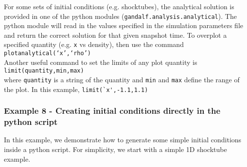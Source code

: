 \documentclass[a4paper]{article}
\newcommand{\var}[1]{\texttt{#1}}
\newcommand{\singlecommand}[1]{\\ \newline \indent \var{#1} \\ \newline \noindent}
\begin{document}




\noindent For some sets of initial conditions (e.g. shocktubes), the analytical solution is provided in one of the python modules (\var{gandalf.analysis.analytical}).  The python module will read in the values specified in the simulation parameters file and return the correct solution for that given snapshot time.  To overplot a specified quantity (e.g. \var{x} vs density), then use the command \singlecommand{plotanalytical(`x',`rho')}  Another useful command to set the limits of any plot quantity is \singlecommand{limit(quantity,min,max)} where \var{quantity} is a string of the quantity and \var{min} and \var{max} define the range of the plot.  In this example, \lstinline{limit(`x',-1.1,1.1)}


\subsubsection{Example 8 - Creating initial conditions directly in the python script}
In this example, we demonstrate how to generate some simple initial conditions inside a python script.  For simplicity, we start with a simple 1D shocktube example. \\
\end{document}
